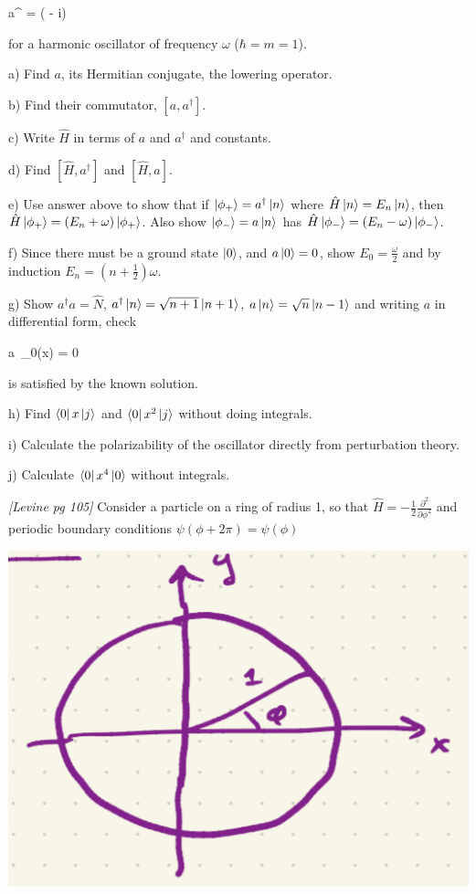 \be
a^{\dagger} = \left( - i\right)
\ee

for a harmonic oscillator of frequency $\omega$ ($\hbar=m=1$). 

a) Find $a$, its Hermitian conjugate, the lowering operator.

b) Find their commutator, $[a,a^{\dagger}]$.

c) Write $\hat{H}$ in terms of $a$ and $a^{\dagger}$ and constants.

d) Find $[\hat{H},a^{\dagger}]$ and $[\hat{H},a]$.

e) Use answer above to show that if $\ket{\phi_{+}} = a^{\dagger}\ket{n}$ where
$\hat{H}\ket{n}=E_n\ket{n}$, then $\hat{H}\ket{\phi_+} = (E_n+\omega)\ket{\phi_+}$.
Also show $\ket{\phi_-}=a\ket{n}$ has $\hat{H}\ket{\phi_-} = (E_n-\omega)\ket{\phi_-}$.

f) Since there must be a ground state $\ket{0}$, and $a\ket{0}=0$,
show $E_0=\frac{\omega}{2}$ and by induction $E_n=(n+\frac{1}{2})\omega$.

g) Show $a^{\dagger}a=\hat{N}$, $a^{\dagger}\ket{n} = \sqrt{n+1}\ket{n+1}$, $a\ket{n} = \sqrt{n}\ket{n-1}$
and writing $a$ in differential form, check

\be
a\, \phi_0(x) = 0
\ee

is satisfied by the known solution.

h) Find $\bra{0}x\ket{j}$ and $\bra{0}x^2\ket{j}$ without doing integrals.

i) Calculate the polarizability of the oscillator directly from perturbation theory.

j) Calculate $\bra{0}x^4\ket{0}$ without integrals.

\newpage
{}
{\em [Levine pg 105]}
Consider a particle on a ring of radius 1, so that $\hat{H}=-\frac{1}{2}\frac{\partial^2}{\partial\phi^2}$
and periodic boundary conditions $\psi(\phi+2\pi)=\psi(\phi)$
\begin{center}
\includegraphics[scale=0.5]{particle_ring}
\end{center}

